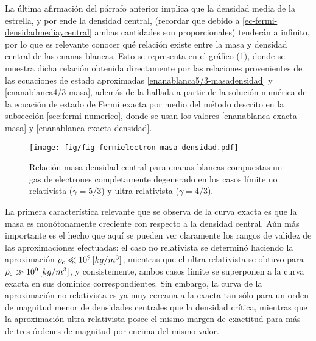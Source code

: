 La última afirmación del párrafo anterior implica que la densidad media de la estrella, y por ende la densidad central, (recordar que debido a \eqref{ec-fermi-densidadmediaycentral} ambas cantidades son proporcionales) tenderán a infinito, por lo que es relevante conocer qué relación existe entre la masa y densidad central de las enanas blancas. Esto se representa en el gráfico (\ref{graficomasa-densidad}), donde se muestra dicha relación obtenida directamente por las relaciones provenientes de las ecuaciones de estado aproximadas \eqref{enanablanca5/3-masadensidad} y \eqref{enanablanca4/3-masa}, además de la hallada a partir de la solución numérica de la ecuación de estado de Fermi exacta  por medio del método descrito en la subsección \ref{sec:fermi-numerico}, donde se usan los valores \eqref{enanablanca-exacta-masa} y \eqref{enanablanca-exacta-densidad}.

\begin{figure}[H]
\centering
\texttt{[image: fig/fig-fermielectron-masa-densidad.pdf]}
\caption{Relación masa-densidad central para enanas blancas compuestas un gas de electrones completamente degenerado en los casos límite no relativista ($\gamma=5/3$) y ultra relativista ($\gamma=4/3$).}\label{graficomasa-densidad}
\end{figure}

La primera característica relevante que se observa de la curva exacta es que la masa es monótonamente creciente con respecto a la densidad central. Aún más importante es el hecho que aquí se pueden ver claramente los rangos de validez de las aproximaciones efectuadas: el caso no relativista se determinó haciendo la aproximación $\rho_{\rm c}\ll10^{9}\,[kg/m^3]$, mientras que el ultra relativista se obtuvo para $\rho_{\rm c}\gg10^{9}\,[kg/m^3]$, y consistemente, ambos casos límite se superponen a la curva exacta en sus dominios correspondientes. Sin embargo, la curva de la aproximación no relativista es ya muy cercana a la exacta tan sólo para un orden de magnitud menor de densidades centrales que la densidad crítica, mientras que la aproximación ultra relativista posee el mismo margen de exactitud para más de tres órdenes de magnitud por encima del mismo valor.

